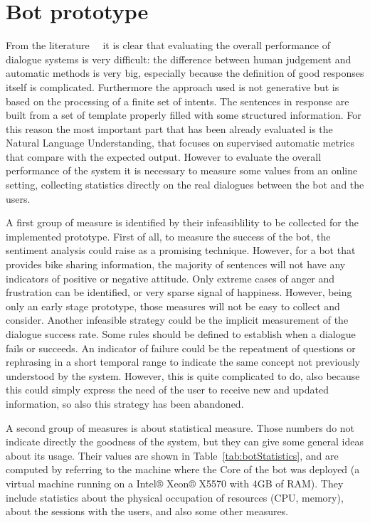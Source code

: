 \section{Bot prototype}
\label{validationPrototype}

From the literature~\cite{liu2016not}~\cite{li2015diversity} it is clear that evaluating the overall performance of dialogue systems is very difficult: the difference between human judgement and automatic methods is very big, especially because the definition of good responses itself is complicated. Furthermore the approach used is not generative but is based on the processing of a finite set of intents. The sentences in response are built from a set of template properly filled with some structured information. For this reason the most important part that has been already evaluated is the Natural Language Understanding, that focuses on supervised automatic metrics that compare with the expected output. However to evaluate the overall performance of the system it is necessary to measure some values from an online setting, collecting statistics directly on the real dialogues between the bot and the users.

A first group of measure is identified by their infeasiblility to be collected for the implemented prototype. First of all, to measure the success of the bot, the sentiment analysis could raise as a promising technique. However, for a bot that provides bike sharing information, the majority of sentences will not have any indicators of positive or negative attitude. Only extreme cases of anger and frustration can be identified, or very sparse signal of happiness. However, being only an early stage prototype, those measures will not be easy to collect and consider. Another infeasible strategy could be the implicit measurement of the dialogue success rate. Some rules should be defined to establish when a dialogue fails or succeeds. An indicator of failure could be the repeatment of questions or rephrasing in a short temporal range to indicate the same concept not previously understood by the system. However, this is quite complicated to do, also because this could simply express the need of the user to receive new and updated information, so also this strategy has been abandoned.



A second group of measures is about statistical measure. Those numbers do not indicate directly the goodness of the system, but they can give some general ideas about its usage. Their values are shown in Table~\ref{tab:botStatistics}, and are computed by referring to the machine where the Core of the bot was deployed (a virtual machine running on a Intel® Xeon® X5570 with 4GB of RAM). They include statistics about the physical occupation of resources (CPU, memory), about the sessions with the users, and also some other measures.

